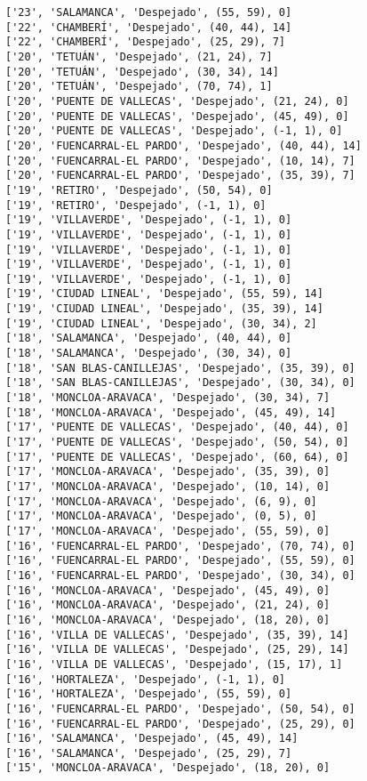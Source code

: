 \documentclass[11pt]{article}
\begin{document}
\begin{Verbatim}[commandchars=\\\{\}]
['23', 'SALAMANCA', 'Despejado', (55, 59), 0]
['22', 'CHAMBERÍ', 'Despejado', (40, 44), 14]
['22', 'CHAMBERÍ', 'Despejado', (25, 29), 7]
['20', 'TETUÁN', 'Despejado', (21, 24), 7]
['20', 'TETUÁN', 'Despejado', (30, 34), 14]
['20', 'TETUÁN', 'Despejado', (70, 74), 1]
['20', 'PUENTE DE VALLECAS', 'Despejado', (21, 24), 0]
['20', 'PUENTE DE VALLECAS', 'Despejado', (45, 49), 0]
['20', 'PUENTE DE VALLECAS', 'Despejado', (-1, 1), 0]
['20', 'FUENCARRAL-EL PARDO', 'Despejado', (40, 44), 14]
['20', 'FUENCARRAL-EL PARDO', 'Despejado', (10, 14), 7]
['20', 'FUENCARRAL-EL PARDO', 'Despejado', (35, 39), 7]
['19', 'RETIRO', 'Despejado', (50, 54), 0]
['19', 'RETIRO', 'Despejado', (-1, 1), 0]
['19', 'VILLAVERDE', 'Despejado', (-1, 1), 0]
['19', 'VILLAVERDE', 'Despejado', (-1, 1), 0]
['19', 'VILLAVERDE', 'Despejado', (-1, 1), 0]
['19', 'VILLAVERDE', 'Despejado', (-1, 1), 0]
['19', 'VILLAVERDE', 'Despejado', (-1, 1), 0]
['19', 'CIUDAD LINEAL', 'Despejado', (55, 59), 14]
['19', 'CIUDAD LINEAL', 'Despejado', (35, 39), 14]
['19', 'CIUDAD LINEAL', 'Despejado', (30, 34), 2]
['18', 'SALAMANCA', 'Despejado', (40, 44), 0]
['18', 'SALAMANCA', 'Despejado', (30, 34), 0]
['18', 'SAN BLAS-CANILLEJAS', 'Despejado', (35, 39), 0]
['18', 'SAN BLAS-CANILLEJAS', 'Despejado', (30, 34), 0]
['18', 'MONCLOA-ARAVACA', 'Despejado', (30, 34), 7]
['18', 'MONCLOA-ARAVACA', 'Despejado', (45, 49), 14]
['17', 'PUENTE DE VALLECAS', 'Despejado', (40, 44), 0]
['17', 'PUENTE DE VALLECAS', 'Despejado', (50, 54), 0]
['17', 'PUENTE DE VALLECAS', 'Despejado', (60, 64), 0]
['17', 'MONCLOA-ARAVACA', 'Despejado', (35, 39), 0]
['17', 'MONCLOA-ARAVACA', 'Despejado', (10, 14), 0]
['17', 'MONCLOA-ARAVACA', 'Despejado', (6, 9), 0]
['17', 'MONCLOA-ARAVACA', 'Despejado', (0, 5), 0]
['17', 'MONCLOA-ARAVACA', 'Despejado', (55, 59), 0]
['16', 'FUENCARRAL-EL PARDO', 'Despejado', (70, 74), 0]
['16', 'FUENCARRAL-EL PARDO', 'Despejado', (55, 59), 0]
['16', 'FUENCARRAL-EL PARDO', 'Despejado', (30, 34), 0]
['16', 'MONCLOA-ARAVACA', 'Despejado', (45, 49), 0]
['16', 'MONCLOA-ARAVACA', 'Despejado', (21, 24), 0]
['16', 'MONCLOA-ARAVACA', 'Despejado', (18, 20), 0]
['16', 'VILLA DE VALLECAS', 'Despejado', (35, 39), 14]
['16', 'VILLA DE VALLECAS', 'Despejado', (25, 29), 14]
['16', 'VILLA DE VALLECAS', 'Despejado', (15, 17), 1]
['16', 'HORTALEZA', 'Despejado', (-1, 1), 0]
['16', 'HORTALEZA', 'Despejado', (55, 59), 0]
['16', 'FUENCARRAL-EL PARDO', 'Despejado', (50, 54), 0]
['16', 'FUENCARRAL-EL PARDO', 'Despejado', (25, 29), 0]
['16', 'SALAMANCA', 'Despejado', (45, 49), 14]
['16', 'SALAMANCA', 'Despejado', (25, 29), 7]
['15', 'MONCLOA-ARAVACA', 'Despejado', (18, 20), 0]

\end{Verbatim}
\end{document}
